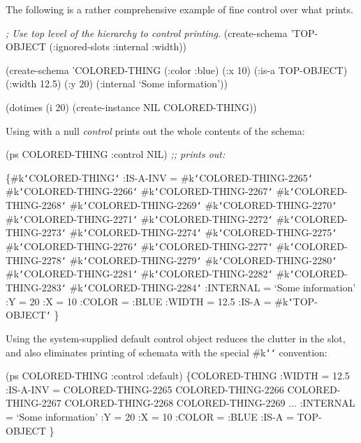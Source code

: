 The following is a rather comprehensive example of fine control over what
 prints.
\begin{programexample}
{\it ; Use top level of the hierarchy to control printing.}
(create-schema 'TOP-OBJECT
  (:ignored-slots :internal :width))

(create-schema 'COLORED-THING (:color :blue) (:x 10)
  (:is-a TOP-OBJECT) (:width 12.5) (:y 20)
  (:internal `Some information'))

(dotimes (i 20) (create-instance NIL COLORED-THING))
\end{programexample}
Using  with a null {\it control} prints out the whole contents of
the schema:
\begin{programexample}
(ps COLORED-THING :control NIL)
{\it ;; prints out:}
\end{programexample}
\begin{programexample}
\{\#k{\tt\char`\<}COLORED-THING{\tt\char`\>}
  :IS-A-INV =  \#k{\tt\char`\<}COLORED-THING-2265{\tt\char`\>}
    \#k{\tt\char`\<}COLORED-THING-2266{\tt\char`\>} \#k{\tt\char`\<}COLORED-THING-2267{\tt\char`\>}
    \#k{\tt\char`\<}COLORED-THING-2268{\tt\char`\>} \#k{\tt\char`\<}COLORED-THING-2269{\tt\char`\>}
    \#k{\tt\char`\<}COLORED-THING-2270{\tt\char`\>} \#k{\tt\char`\<}COLORED-THING-2271{\tt\char`\>}
    \#k{\tt\char`\<}COLORED-THING-2272{\tt\char`\>} \#k{\tt\char`\<}COLORED-THING-2273{\tt\char`\>}
    \#k{\tt\char`\<}COLORED-THING-2274{\tt\char`\>} \#k{\tt\char`\<}COLORED-THING-2275{\tt\char`\>}
    \#k{\tt\char`\<}COLORED-THING-2276{\tt\char`\>} \#k{\tt\char`\<}COLORED-THING-2277{\tt\char`\>}
    \#k{\tt\char`\<}COLORED-THING-2278{\tt\char`\>} \#k{\tt\char`\<}COLORED-THING-2279{\tt\char`\>}
    \#k{\tt\char`\<}COLORED-THING-2280{\tt\char`\>} \#k{\tt\char`\<}COLORED-THING-2281{\tt\char`\>}
    \#k{\tt\char`\<}COLORED-THING-2282{\tt\char`\>} \#k{\tt\char`\<}COLORED-THING-2283{\tt\char`\>}
    \#k{\tt\char`\<}COLORED-THING-2284{\tt\char`\>}
  :INTERNAL =  `Some information'
  :Y =  20
  :X =  10
  :COLOR =  :BLUE
  :WIDTH =  12.5
  :IS-A =  \#k{\tt\char`\<}TOP-OBJECT{\tt\char`\>}
\}
\end{programexample}
Using the system-supplied default control object reduces the clutter in the
 slot, and also eliminates printing of schemata with the
special \#k{\tt\char`\<}{\tt\char`\>} convention:
\begin{programexample}
(ps COLORED-THING :control :default)
\{COLORED-THING
  :WIDTH =  12.5
  :IS-A-INV =  COLORED-THING-2265 COLORED-THING-2266
     COLORED-THING-2267 COLORED-THING-2268
     COLORED-THING-2269 ...
  :INTERNAL =  `Some information'
  :Y =  20
  :X =  10
  :COLOR =  :BLUE
  :IS-A =  TOP-OBJECT
\}
\end{programexample}
